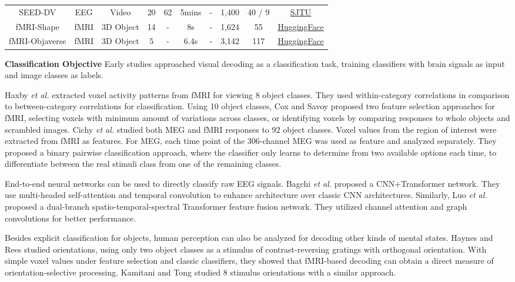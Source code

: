 \documentclass[journal]{IEEEtran}
\begin{document}
\begin{table*}[htpb]
{\begin{tabular}{c|c|c|c|c|c|c|c|c|c}
SEED-DV \cite{Liu2024} & EEG & Video & 20 & 62 & 5mins & - & 1,400 & 40 / 9 & \href{https://bcmi.sjtu.edu.cn/home/eeg2video/}{SJTU} \\
fMRI-Shape \cite{Gao2024} & fMRI & 3D Object & 14 & - & 8s & - & 1,624 & 55 & \href{https://huggingface.co/datasets/Fudan-fMRI/fMRI-Shape}{HuggingFace} \\
fMRI-Objaverse \cite{Gao2024} & fMRI & 3D Object & 5 & - & 6.4s & - & 3,142 & 117 & \href{https://huggingface.co/datasets/Fudan-fMRI/fMRI-Objaverse}{HuggingFace} \\
\bottomrule
\end{tabular}}
\end{table*}

\textbf{Classification Objective} Early studies approached visual decoding as a classification task, training classifiers with brain signals as input and image classes as labels.

Haxby \emph{et al.} \cite{Haxby2001} extracted voxel activity patterns from fMRI for viewing 8 object classes. They used within-category correlations in comparison to between-category correlations for classification. Using 10 object classes, Cox and Savoy \cite{Cox2003} proposed two feature selection approaches for fMRI, selecting voxels with minimum amount of variations across classes, or identifying voxels by comparing responses to whole objects and scrambled images. Cichy \emph{et al.} \cite{Cichy2014} studied both MEG and fMRI responses to 92 object classes. Voxel values from the region of interest were extracted from fMRI as features. For MEG, each time point of the 306-channel MEG was used as feature and analyzed separately. They proposed a binary pairwise classification approach, where the classifier only learns to determine from two available options each time, to differentiate between the real stimuli class from one of the remaining classes.

End-to-end neural networks can be used to directly classify raw EEG signals. Bagchi \emph{et al.} \cite{Bagchi2022} proposed a CNN+Transformer network. They use multi-headed self-attention and temporal convolution to enhance architecture over classic CNN architectures. Similarly, Luo \emph{et al.} \cite{Luo2024a} proposed a dual-branch spatio-temporal-spectral Transformer feature fusion network. They utilized channel attention and graph convolutions for better performance.

Besides explicit classification for objects, human perception can also be analyzed for decoding other kinds of mental states. Haynes and Rees \cite{Haynes2005} studied orientations, using only two object classes as a stimulus of contrast-reversing gratings with orthogonal orientation. With simple voxel values under feature selection and classic classifiers, they showed that fMRI-based decoding can obtain a direct measure of orientation-selective processing. Kamitani and Tong \cite{Kamitani2005} studied 8 stimulus orientations with a similar approach.
\end{document}
